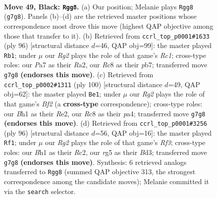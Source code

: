 \documentclass[11pt]{article}
\begin{document}
\clearpage

\begin{figure}[p]\centering
\begin{subfigure}{0.46\textwidth}\centering
\resizebox{\linewidth}{!}{%
\newchessgame
\chessboard[
  setfen={2r5/p1p1k1r1/P1p3p1/2P2pRp/1P3P1P/8/5K2/RN5b b - - 21 49},
  showmover=false,
  pgfstyle=straightmove, color=movearrow, markmove={g7-g8}
]}
\caption{}
\end{subfigure}\hfill
\begin{subfigure}{0.46\textwidth}\centering
\resizebox{\linewidth}{!}{%
\newchessgame
\chessboard[
  setfen={1k6/1p6/p4pp1/P1r5/2Pr1PpP/6P1/R5K1/2R5 w - - 2 49},
  showmover=false,
  pgfstyle=straightmove, color=movearrow, markmove={c1-b1}
]}
\caption{}
\end{subfigure}
\\[4pt]
\begin{subfigure}{0.46\textwidth}\centering
\resizebox{\linewidth}{!}{%
\newchessgame
\chessboard[
  setfen={8/3k2p1/5p1p/3b3P/pprP3K/P4P2/1P2RBP1/8 w - - 0 51},
  showmover=false,
  pgfstyle=straightmove, color=movearrow, markmove={f2-e1}
]}
\caption{}
\end{subfigure}\hfill
\begin{subfigure}{0.46\textwidth}\centering
\resizebox{\linewidth}{!}{%
\newchessgame
\chessboard[
  setfen={3k1r2/8/1p1nr1p1/p2p2Pp/P4P1P/KP1B1R2/2R5/8 w - - 2 49},
  showmover=false,
  pgfstyle=straightmove, color=movearrow, markmove={f3-f1}
]}
\caption{}
\end{subfigure}
\caption{\textbf{Move 49, Black: \texttt{Rgg8}.} (a) Our position; Melanie plays \texttt{Rgg8} (\texttt{g7g8}). Panels (b)--(d) are the retrieved master positions whose correspondence most drove this move (highest QAP objective among those that transfer to it). (b) Retrieved from \texttt{ccrl\_top\_p0001\#1633} (ply 96) [structural distance $d$=46, QAP obj=99]: the master played \texttt{Rb1}; under $\mu$ our \emph{Rg2} plays the role of that game's \emph{Rc1}; cross-type roles: our \emph{P}a7 as their \emph{R}a2, our \emph{R}c8 as their \emph{p}b7; transferred move \texttt{g7g8} \textbf{(endorses this move)}. (c) Retrieved from \texttt{ccrl\_top\_p0002\#1311} (ply 100) [structural distance $d$=49, QAP obj=62]: the master played \texttt{Be1}; under $\mu$ our \emph{Rg2} plays the role of that game's \emph{Bf2} (a \textbf{cross-type} correspondence); cross-type roles: our \emph{B}h1 as their \emph{R}e2, our \emph{R}c8 as their \emph{p}a4; transferred move \texttt{g7g8} \textbf{(endorses this move)}. (d) Retrieved from \texttt{ccrl\_top\_p0001\#3256} (ply 96) [structural distance $d$=56, QAP obj=16]: the master played \texttt{Rf1}; under $\mu$ our \emph{Rg2} plays the role of that game's \emph{Rf3}; cross-type roles: our \emph{B}h1 as their \emph{R}c2, our \emph{r}g5 as their \emph{B}d3; transferred move \texttt{g7g8} \textbf{(endorses this move)}. Synthesis: 6 retrieved analogs transferred to \texttt{Rgg8} (summed QAP objective 313, the strongest correspondence among the candidate moves); Melanie committed it via the \texttt{search} selector.}
\label{fig:thought-m97}
\end{figure}
\end{document}
